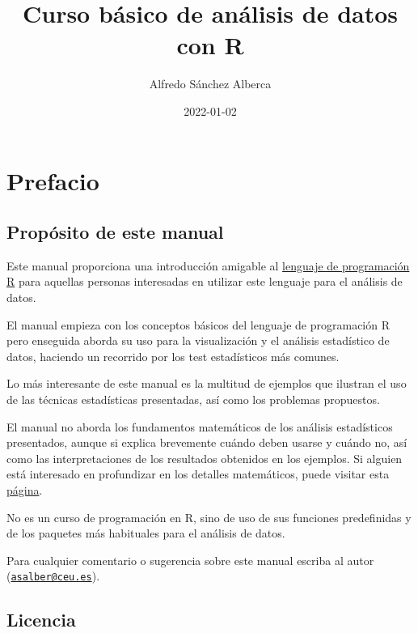 \documentclass[
]{book}
\title{Curso básico de análisis de datos con R}
\author{Alfredo Sánchez Alberca}
\date{2022-01-02}
\theoremstyle{definition}
\theoremstyle{definition}
\theoremstyle{definition}
\theoremstyle{definition}
\theoremstyle{remark}
\begin{document}
\maketitle

{
\setcounter{tocdepth}{1}
\tableofcontents
}
\hypertarget{prefacio}{%
\chapter*{Prefacio}\label{prefacio}}

\hypertarget{propuxf3sito-de-este-manual}{%
\section*{Propósito de este manual}\label{propuxf3sito-de-este-manual}}

Este manual proporciona una introducción amigable al \href{https://www.r-project.org/}{lenguaje de programación R} para aquellas personas interesadas en utilizar este lenguaje para el análisis de datos.

El manual empieza con los conceptos básicos del lenguaje de programación R pero enseguida aborda su uso para la visualización y el análisis estadístico de datos, haciendo un recorrido por los test estadísticos más comunes.

Lo más interesante de este manual es la multitud de ejemplos que ilustran el uso de las técnicas estadísticas presentadas, así como los problemas propuestos.

El manual no aborda los fundamentos matemáticos de los análisis estadísticos presentados, aunque si explica brevemente cuándo deben usarse y cuándo no, así como las interpretaciones de los resultados obtenidos en los ejemplos. Si alguien está interesado en profundizar en los detalles matemáticos, puede visitar esta \href{https://aprendeconalf.es/docencia/estadistica/}{página}.

No es un curso de programación en R, sino de uso de sus funciones predefinidas y de los paquetes más habituales para el análisis de datos.

Para cualquier comentario o sugerencia sobre este manual escriba al autor (\href{mailto:asalber@ceu.es}{\nolinkurl{asalber@ceu.es}}).

\hypertarget{licencia}{%
\section*{Licencia}\label{licencia}}
\end{document}
